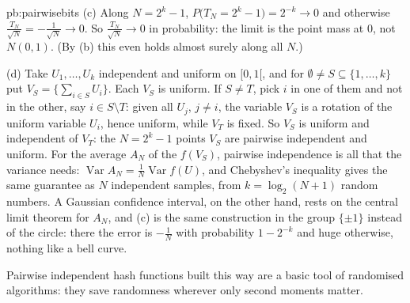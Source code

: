 \begin{solution}{pb:pairwisebits}
(c) Along $N=2^k-1$, $P\bigl(T_N=2^k-1\bigr)=2^{-k}\to0$ and otherwise $\frac{T_N}{\sqrt N}=-\frac1{\sqrt N}\to0$. So $\frac{T_N}{\sqrt N}\to0$ in probability: the limit is the
point mass at $0$, not $N(0,1)$. (By (b) this even holds almost surely along all $N$.)

(d) Take $U_1,\dots,U_k$ independent and uniform on $[0,1[$, and for $\emptyset\ne S\subseteq\{1,\dots,k\}$ put $V_S=\bigl\{\sum_{i\in S}U_i\bigr\}$. Each $V_S$ is uniform.
If $S\ne T$, pick $i$ in one of them and not in the other, say $i\in S\setminus T$: given all $U_j$, $j\ne i$, the variable $V_S$ is a rotation of the uniform variable
$U_i$, hence uniform, while $V_T$ is fixed. So $V_S$ is uniform and independent of $V_T$: the $N=2^k-1$ points $V_S$ are pairwise independent and uniform. For the average
$A_N$ of the $f(V_S)$, pairwise independence is all that the variance needs: $\operatorname{Var}A_N=\frac1N\operatorname{Var}f(U)$, and Chebyshev's inequality gives the
same guarantee as $N$ independent samples, from $k=\log_2(N+1)$ random numbers. A Gaussian confidence interval, on the other hand, rests on the central limit theorem
for $A_N$, and (c) is the same construction in the group $\{\pm1\}$ instead of the circle: there the error is $-\frac1N$ with probability $1-2^{-k}$ and huge otherwise,
nothing like a bell curve.

\leads Pairwise independent hash functions built this way are a basic tool of randomised algorithms: they save randomness wherever only second moments
matter.
\end{solution}

